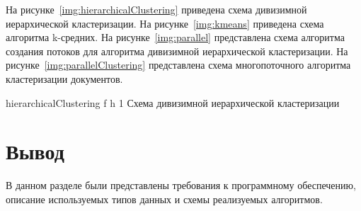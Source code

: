На рисунке~\ref{img:hierarchicalClustering} приведена схема дивизимной иерархической кластеризации.
На рисунке~\ref{img:kmeans} приведена схема алгоритма k-средних.
На рисунке~\ref{img:parallel} представлена схема алгоритма создания потоков для алгоритма дивизимной иерархической кластеризации.
На рисунке~\ref{img:parallelClustering} представлена схема многопоточного алгоритма кластеризации документов.

{hierarchicalClustering} %
{f} %
{h} %
{1\textwidth} %
{Схема дивизимной иерархической кластеризации} %
\clearpage

\fi

\section *{Вывод}

В данном разделе были представлены требования к программному обеспечению, описание используемых типов данных и схемы реализуемых алгоритмов.
